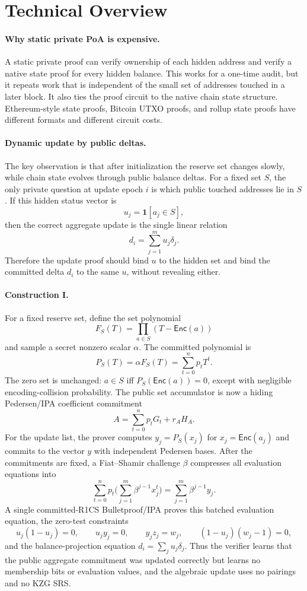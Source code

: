 \documentclass[runningheads]{llncs}
\newcommand{\Enc}{\mathsf{Enc}}
\begin{document}
\section{Technical Overview}

\paragraph{Why static private PoA is expensive.}
A static private proof can verify ownership of each hidden address and verify a native state proof for every hidden balance.  This works for a one-time audit, but it repeats work that is independent of the small set of addresses touched in a later block.  It also ties the proof circuit to the native chain state structure.  Ethereum-style state proofs, Bitcoin UTXO proofs, and rollup state proofs have different formats and different circuit costs.

\paragraph{Dynamic update by public deltas.}
The key observation is that after initialization the reserve set changes slowly, while chain state evolves through public balance deltas.  For a fixed set \(S\), the only private question at update epoch \(i\) is which public touched addresses lie in \(S\).  If this hidden status vector is
\[
        u_j=\mathbf{1}[a_j\in S],
\]
then the correct aggregate update is the single linear relation
\[
        d_i=\sum_{j=1}^m u_j\delta_j.
\]
Therefore the update proof should bind \(u\) to the hidden set and bind the committed delta \(d_i\) to the same \(u\), without revealing either.

\paragraph{Construction I.}
For a fixed reserve set, define the set polynomial
\[
        F_S(T)=\prod_{a\in S}(T-\Enc(a))
\]
and sample a secret nonzero scalar \(\alpha\).  The committed polynomial is
\[
        P_S(T)=\alpha F_S(T)=\sum_{t=0}^n p_tT^t .
\]
The zero set is unchanged: \(a\in S\) iff \(P_S(\Enc(a))=0\), except with negligible encoding-collision probability.  The public set accumulator is now a hiding Pedersen/IPA coefficient commitment
\[
        A=\sum_{t=0}^np_tG_t+r_AH_A.
\]
For the update list, the prover computes \(y_j=P_S(x_j)\) for \(x_j=\Enc(a_j)\) and commits to the vector \(y\) with independent Pedersen bases.  After the commitments are fixed, a Fiat--Shamir challenge \(\beta\) compresses all evaluation equations into
\[
        \sum_{t=0}^np_t\Big(\sum_{j=1}^m\beta^{j-1}x_j^t\Big)
        =
        \sum_{j=1}^m\beta^{j-1}y_j .
\]
A single committed-R1CS Bulletproof/IPA proves this batched evaluation equation, the zero-test constraints
\[
 u_j(1-u_j)=0,\qquad u_jy_j=0,\qquad y_jz_j=w_j,\qquad (1-u_j)(w_j-1)=0,
\]
and the balance-projection equation \(d_i=\sum_j u_j\delta_j\).  Thus the verifier learns that the public aggregate commitment was updated correctly but learns no membership bits or evaluation values, and the algebraic update uses no pairings and no KZG SRS.
\end{document}
